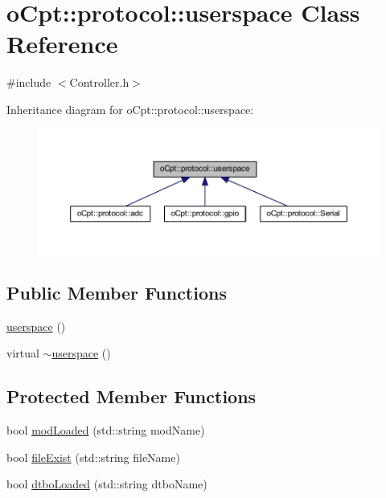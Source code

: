 \hypertarget{classo_cpt_1_1protocol_1_1userspace}{}\section{o\+Cpt\+:\+:protocol\+:\+:userspace Class Reference}
\label{classo_cpt_1_1protocol_1_1userspace}


{\ttfamily \#include $<$Controller.\+h$>$}



Inheritance diagram for o\+Cpt\+:\+:protocol\+:\+:userspace\+:\nopagebreak
\begin{figure}[H]
\begin{center}
\leavevmode
\includegraphics[width=350pt]{classo_cpt_1_1protocol_1_1userspace__inherit__graph}
\end{center}
\end{figure}
\subsection*{Public Member Functions}
\begin{DoxyCompactItemize}
\item 
\hyperlink{classo_cpt_1_1protocol_1_1userspace_a845ca02e8c8613813d643c64e6e917c3}{userspace} ()
\item 
virtual \hyperlink{classo_cpt_1_1protocol_1_1userspace_ae97e147b38f9a48ca9389960b7378d25}{$\sim$userspace} ()
\end{DoxyCompactItemize}
\subsection*{Protected Member Functions}
\begin{DoxyCompactItemize}
\item 
bool \hyperlink{classo_cpt_1_1protocol_1_1userspace_aac8635fbc254fff76642cf6910484a02}{mod\+Loaded} (std\+::string mod\+Name)
\item 
bool \hyperlink{classo_cpt_1_1protocol_1_1userspace_a3c35e581abd2a06de6feb160e25ac35b}{file\+Exist} (std\+::string file\+Name)
\item 
bool \hyperlink{classo_cpt_1_1protocol_1_1userspace_ac5a9bd7fbdbc94edb7b3baaafabbe11e}{dtbo\+Loaded} (std\+::string dtbo\+Name)
\end{DoxyCompactItemize}
